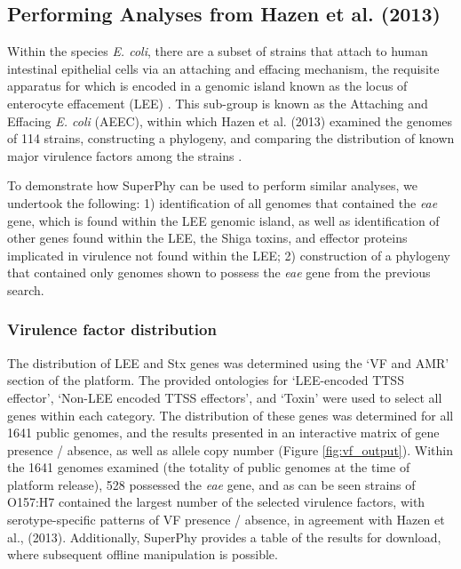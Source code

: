 \documentclass[doublespacing, linenumbers]{bmcart}
\begin{document}
\subsection{Performing Analyses from Hazen et al. (2013)}
Within the species \textit{E. coli}, there are a subset of strains that attach to human intestinal epithelial cells via an attaching and effacing mechanism, the requisite apparatus for which is encoded in a genomic island known as the locus of enterocyte effacement (LEE) \cite{croxen_recent_2013}.  This sub-group is known as the Attaching and Effacing \textit{E. coli} (AEEC), within which Hazen et al. (2013) examined the genomes of 114 strains, constructing a phylogeny, and comparing the distribution of known major virulence factors among the strains \cite{hazen_refining_2013}.

To demonstrate how SuperPhy can be used to perform similar analyses, we undertook the following: 1) identification of all genomes that contained the \textit{eae} gene, which is found within the LEE genomic island, as well as identification of other genes found within the LEE,  the Shiga toxins, and effector proteins implicated in virulence not found within the LEE; 2) construction of a phylogeny that contained only genomes shown to possess the \textit{eae} gene from the previous search.

\subsubsection{Virulence factor distribution}
The distribution of LEE and Stx genes was determined using the `VF and AMR'  section of the platform. The provided ontologies for `LEE-encoded TTSS effector', `Non-LEE encoded TTSS effectors', and `Toxin' were used to select all genes within each category. The distribution of these genes was determined for all 1641 public genomes, and the results presented in an interactive matrix of gene presence / absence, as well as allele copy number (Figure \ref{fig:vf_output}). Within the 1641 genomes examined (the totality of public genomes at the time of platform release), 528 possessed the \textit{eae} gene, and as can be seen strains of O157:H7 contained the largest number of the selected virulence factors, with serotype-specific patterns of VF presence / absence, in agreement with Hazen et al., (2013). Additionally, SuperPhy provides a table of the results for download, where subsequent offline manipulation is possible.
\end{document}
